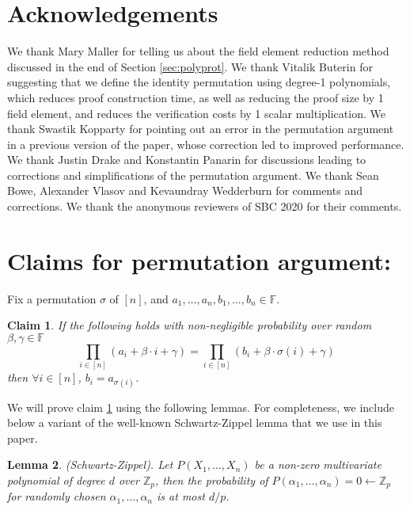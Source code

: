 \documentclass[11pt]{article} %
\newcommand{\F}{\ensuremath{\mathbb F}\xspace}
\newtheorem{lemma}{Lemma}[section]
\newtheorem{claim}[lemma]{Claim}
\begin{document}
 \section*{Acknowledgements} We thank Mary Maller for telling us about the field element reduction method discussed in the end of Section \ref{sec:polyprot}. We thank Vitalik Buterin for suggesting that we define the identity permutation using degree-1 polynomials, which reduces proof construction time, as well as reducing the proof size by 1 field element, and reduces the verification costs by 1 scalar multiplication. We thank Swastik Kopparty for pointing out an error in the permutation argument in a previous version of the paper, whose correction led to improved performance. We thank Justin Drake and Konstantin Panarin for discussions leading to corrections and simplifications of the permutation argument. We thank Sean Bowe, Alexander Vlasov and Kevaundray Wedderburn for comments and corrections. We thank the anonymous reviewers of SBC 2020 for their comments.

    
\appendix
    
    

\section{Claims for permutation argument:}

Fix a permutation $\sigma$ of $[n]$, and $a_1,\ldots,a_n,b_1,\ldots,b_n \in \F$.
\begin{claim}\label{clm:randpermO}
 If the following holds with non-negligible probability over random $\beta,\gamma \in \F$
 \[\prod_{i\in [n]} (a_i + \beta \cdot i + \gamma) = \prod_{i\in [n]} (b_i+ \beta \cdot \sigma(i) + \gamma)\] 
 then $\forall i \in [n]$, $b_i = a_{\sigma(i)}$.
\end{claim}

We will prove claim \ref{clm:randpermO} using the following lemmas. For completeness, we include below a variant of the well-known Schwartz-Zippel lemma that we use in this paper.

\begin{lemma}(Schwartz-Zippel). Let $P(X_1, \ldots, X_n)$ be a non-zero multivariate polynomial of degree $d$ over $\mathbb{Z}_p$, then
the probability of $P(\alpha_1, \ldots, \alpha_n)= 0 \leftarrow \mathbb{Z}_p$ for randomly chosen $\alpha_1, \ldots, \alpha_n$ is at most $d/p$.
\end{lemma}
\end{document}
